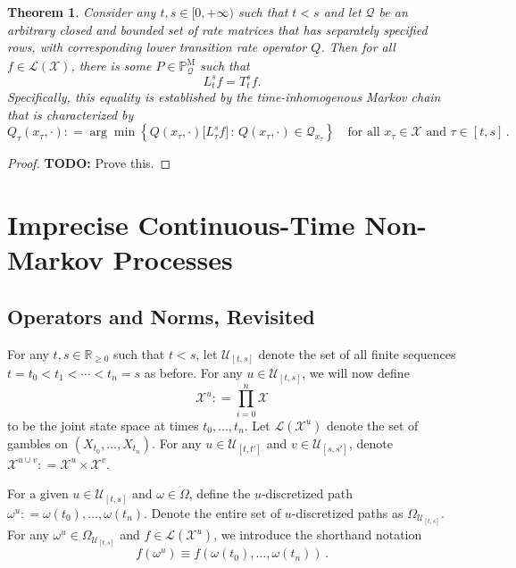 \documentclass[10pt]{paper}
\newtheorem{theorem}{Theorem}
\newcommand{\reals}{\mathbb{R}}
\newcommand{\realsnonneg}{\reals_{\geq 0}}
\newcommand{\states}{\mathcal{X}}
\newcommand{\processes}{\mathbb{P}}
\newcommand{\mprocesses}{\processes^{\mathrm{M}}}
\newcommand{\lbound}{L}
\newcommand{\gambles}{\mathcal{L}}
\newcommand{\gamblesX}{\gambles(\states)}
\newcommand{\rateset}{\mathcal{Q}}
\newcommand{\lrate}{\underline{Q}}
\newcommand{\coloneqq}{:\!=}
\newcommand{\argmin}{\arg\min}
\begin{document}
\begin{theorem}
Consider any $t,s\in[0,+\infty)$ such that $t<s$ and let $\rateset$ be an arbitrary closed and bounded set of rate matrices that has separately specified rows, with corresponding lower transition rate operator $\lrate$. Then for all $f\in\gamblesX$, there is some $P\in\mprocesses_{\rateset}$ such that
\begin{equation*}
\lbound_t^sf=T_t^sf.
\end{equation*}
Specifically, this equality is established by the time-inhomogenous Markov chain that is characterized by 
\begin{equation*}
Q_\tau(x_\tau,\cdot)\coloneqq \argmin\left\{ Q(x_\tau,\cdot)\bigl[\lbound_\tau^sf\bigr]\,:\,Q(x_\tau,\cdot)\in\mathcal{Q}_{x_\tau}\right\}\quad\text{for all $x_\tau\in\states$ and $\tau\in[t,s]$}\,.
\end{equation*}
\end{theorem}
\begin{proof}
{\bf TODO:} Prove this.
\end{proof}

\section{Imprecise Continuous-Time Non-Markov Processes}\label{sec:imp_non_markov}

\subsection{Operators and Norms, Revisited}
For any $t,s \in \realsnonneg$ such that $t < s$, let $\mathcal{U}_{[t,s]}$ denote the set of all finite sequences $t=t_0 < t_1 < \cdots < t_n=s$ as before. For any $u\in\mathcal{U}_{[t,s]}$, we will now define
\begin{equation*}
\states^u\coloneqq \prod_{i=0}^n\states
\end{equation*}
to be the joint state space at times $t_0,\ldots,t_n$. Let $\gambles(\states^u)$ denote the set of gambles on $(X_{t_0},\ldots,X_{t_n})$. For any $u\in\mathcal{U}_{[t,t']}$ and $v\in\mathcal{U}_{[s,s']}$, denote $\states^{u\cup v}\coloneqq\states^u\times\states^v$.

For a given $u\in\mathcal{U}_{[t,s]}$ and $\omega\in\Omega$, define the $u$-discretized path $\omega^u\coloneqq \omega(t_0),\ldots,\omega(t_n)$. Denote the entire set of $u$-discretized paths as $\Omega_{\mathcal{U}_{[t,s]}}$. For any $\omega^u\in\Omega_{\mathcal{U}_{[t,s]}}$ and $f\in\gambles(\states^u)$, we introduce the shorthand notation
\begin{equation*}
f(\omega^u) \equiv f(\omega(t_0),\ldots,\omega(t_n))\,.
\end{equation*}
\end{document}
